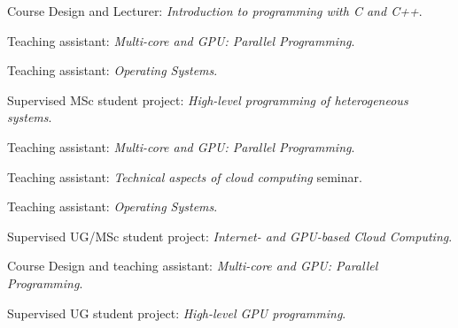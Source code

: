 \begin{cvitemize}[2012 - 2013]
    \item  Course Design and Lecturer:
        \emph{Introduction to programming with C and C++}.
      \item    Teaching assistant:
        \emph{Multi-core and GPU\@: Parallel Programming}.
    \item Teaching assistant:
        \emph{Operating Systems}.
\end{cvitemize}

\begin{cvitemize}[2011 - 2012]
    \item Supervised MSc student project:
        \emph{High-level programming of heterogeneous systems}.
      \item Teaching assistant:
        \emph{Multi-core and GPU\@: Parallel Programming}.
    \item Teaching assistant:
        \emph{Technical aspects of cloud computing} seminar.
      \item Teaching assistant:
        \emph{Operating Systems}.
\end{cvitemize}

\begin{cvitemize}[2010 - 2011]
    \item Supervised UG/MSc student project:
        \emph{Internet- and GPU-based Cloud Computing}.
      \item Course Design and teaching assistant:
        \emph{Multi-core and GPU\@: Parallel Programming}.
    \item Supervised UG student project:
        \emph{High-level GPU programming}.
\end{cvitemize}